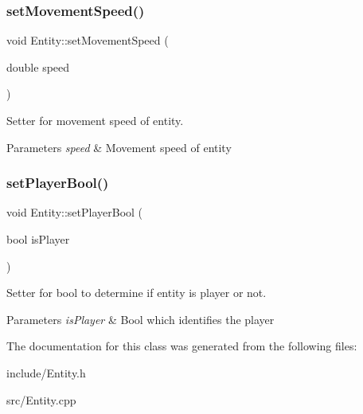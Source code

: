 \subsubsection{\texorpdfstring{set\+Movement\+Speed()}{setMovementSpeed()}}
{\footnotesize\ttfamily void Entity\+::set\+Movement\+Speed (\begin{DoxyParamCaption}\item[{double}]{speed }\end{DoxyParamCaption})}



Setter for movement speed of entity. 


\begin{DoxyParams}{Parameters}
{\em speed} & Movement speed of entity \\
\hline
\end{DoxyParams}
\mbox{\label{classEntity_ad80d65640fe9dd1ae0a0660f02dc60f5}} 
\subsubsection{\texorpdfstring{set\+Player\+Bool()}{setPlayerBool()}}
{\footnotesize\ttfamily void Entity\+::set\+Player\+Bool (\begin{DoxyParamCaption}\item[{bool}]{is\+Player }\end{DoxyParamCaption})}



Setter for bool to determine if entity is player or not. 


\begin{DoxyParams}{Parameters}
{\em is\+Player} & Bool which identifies the player \\
\hline
\end{DoxyParams}


The documentation for this class was generated from the following files\+:\begin{DoxyCompactItemize}
\item 
include/Entity.\+h\item 
src/Entity.\+cpp\end{DoxyCompactItemize}
